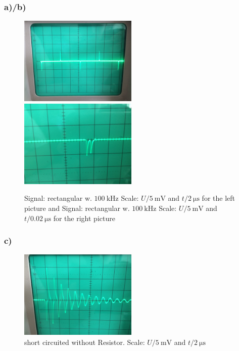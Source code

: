 \subsubsection{a)/b)}
\begin{figure}[h]
	\includegraphics[width=0.5\textwidth]{153_1}
	\includegraphics[width=0.5\textwidth]{153_2}
	\caption{Signal: rectangular w. $\SI{100}{\kilo\hertz}$ Scale: $U/\SI{5}{\milli\volt}$ and $t/\SI{2}{\micro\s}$ for the left picture and Signal: rectangular w. $\SI{100}{\kilo\hertz}$ Scale: $U/\SI{5}{\milli\volt}$ and $t/\SI{0.02}{\micro\s}$ for the right picture}
\end{figure}
\subsubsection{c)}
\begin{figure}[h]
	\centering
	\includegraphics[width=0.5\textwidth]{153_kurz_mag}
	\caption{short circuited without Resistor. Scale: $U/\SI{5}{\milli\volt}$ and $t/\SI{2}{\micro\s}$}
\end{figure}